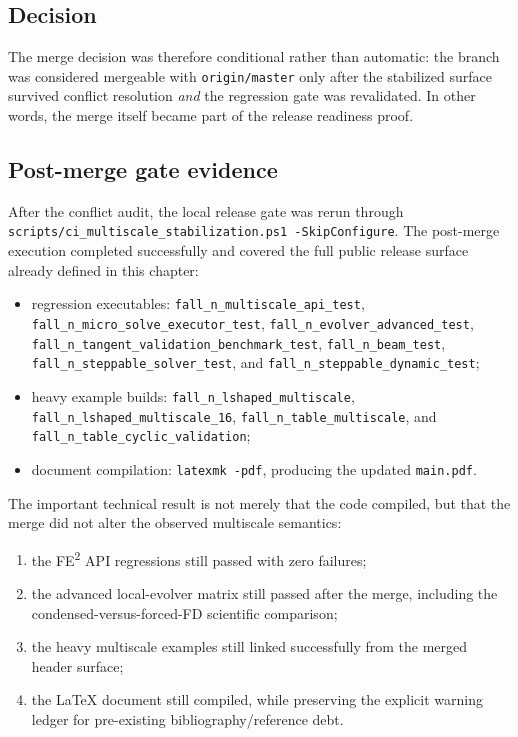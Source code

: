 \subsection{Decision}

The merge decision was therefore conditional rather than automatic: the branch
was considered mergeable with \texttt{origin/master} only after the stabilized
surface survived conflict resolution \emph{and} the regression gate was
revalidated.  In other words, the merge itself became part of the release
readiness proof.

\subsection{Post-merge gate evidence}

After the conflict audit, the local release gate was rerun through
\texttt{scripts/ci\_multiscale\_stabilization.ps1 -SkipConfigure}.  The
post-merge execution completed successfully and covered the full public release
surface already defined in this chapter:
\begin{itemize}
  \item regression executables:
    \texttt{fall\_n\_multiscale\_api\_test},
    \texttt{fall\_n\_micro\_solve\_executor\_test},
    \texttt{fall\_n\_evolver\_advanced\_test},
    \texttt{fall\_n\_tangent\_validation\_benchmark\_test},
    \texttt{fall\_n\_beam\_test},
    \texttt{fall\_n\_steppable\_solver\_test}, and
    \texttt{fall\_n\_steppable\_dynamic\_test};
  \item heavy example builds:
    \texttt{fall\_n\_lshaped\_multiscale},
    \texttt{fall\_n\_lshaped\_multiscale\_16},
    \texttt{fall\_n\_table\_multiscale}, and
    \texttt{fall\_n\_table\_cyclic\_validation};
  \item document compilation:
    \texttt{latexmk -pdf}, producing the updated \texttt{main.pdf}.
\end{itemize}

The important technical result is not merely that the code compiled, but that
the merge did not alter the observed multiscale semantics:
\begin{enumerate}
  \item the FE\textsuperscript{2} API regressions still passed with zero
    failures;
  \item the advanced local-evolver matrix still passed after the merge,
    including the condensed-versus-forced-FD scientific comparison;
  \item the heavy multiscale examples still linked successfully from the merged
    header surface;
  \item the \LaTeX{} document still compiled, while preserving the explicit
    warning ledger for pre-existing bibliography/reference debt.
\end{enumerate}

